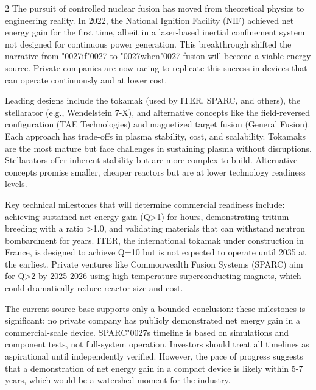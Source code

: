 \documentclass[10pt,a4paper]{article}
\newcommand{\BOApos}{{\BOQuoteFont\char"0027}}
\begin{document}
\begin{multicols}{2}
{\small The pursuit of controlled nuclear fusion has moved from theoretical physics to engineering reality. In 2022, the National Ignition Facility (NIF) achieved net energy gain for the first time, albeit in a laser-based inertial confinement system not designed for continuous power generation. This breakthrough shifted the narrative from \BOApos{}if\BOApos{} to \BOApos{}when\BOApos{} fusion will become a viable energy source. Private companies are now racing to replicate this success in devices that can operate continuously and at lower cost.}\par
{\small Leading designs include the tokamak (used by ITER, SPARC, and others), the stellarator (e.g., Wendelstein 7-X), and alternative concepts like the field-reversed configuration (TAE Technologies) and magnetized target fusion (General Fusion). Each approach has trade-offs in plasma stability, cost, and scalability. Tokamaks are the most mature but face challenges in sustaining plasma without disruptions. Stellarators offer inherent stability but are more complex to build. Alternative concepts promise smaller, cheaper reactors but are at lower technology readiness levels.}\par
{\small Key technical milestones that will determine commercial readiness include: achieving sustained net energy gain (Q>1) for hours, demonstrating tritium breeding with a ratio >1.0, and validating materials that can withstand neutron bombardment for years. ITER, the international tokamak under construction in France, is designed to achieve Q=10 but is not expected to operate until 2035 at the earliest. Private ventures like Commonwealth Fusion Systems (SPARC) aim for Q>2 by 2025-2026 using high-temperature superconducting magnets, which could dramatically reduce reactor size and cost.}\par
{\small The current source base supports only a bounded conclusion: these milestones is significant: no private company has publicly demonstrated net energy gain in a commercial-scale device. SPARC\BOApos{}s timeline is based on simulations and component tests, not full-system operation. Investors should treat all timelines as aspirational until independently verified. However, the pace of progress suggests that a demonstration of net energy gain in a compact device is likely within 5-7 years, which would be a watershed moment for the industry.}\par
\end{multicols}
\end{document}
